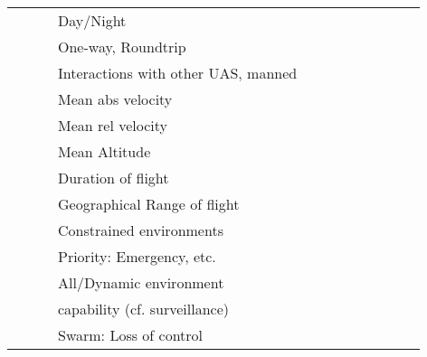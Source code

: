 \documentclass{report}
\begin{document}
\begin{centering}
\begin{longtable}{|l|l|l|l|c|c|c|c|c|c|c|c|}
   & & & Day/Night & & & & & & & & \\\cline{4-4}
   & & & One-way, Roundtrip & & & & & & & & \\\cline{4-4}
   & & & Interactions with other UAS, manned & & & & & & & & \\\cline{4-4}
   & & & Mean abs velocity & & & & & & & & \\\cline{4-4}
   & & & Mean rel velocity & & & & & & & & \\\cline{4-4}
   & & & Mean Altitude & & & & & & & & \\\cline{4-4}
   & & & Duration of flight & & & & & & & & \\\cline{4-4}
   & & & Geographical Range of flight & & & & & & & & \\\cline{4-4}
   & & & Constrained environments & & & & & & & & \\\cline{4-4}
   & & & Priority: Emergency, etc. & & & & & & & & \\\cline{4-4}
   & & & All/Dynamic environment & & & & & & & & \\
   & & & capability (cf. surveillance) & & & & & & & & \\\cline{4-4}
   & & & Swarm: Loss of control & & & & & & & & \\\cline{1-4}

\hline
\end{longtable}
\end{centering}
% 
% 
\end{document}
